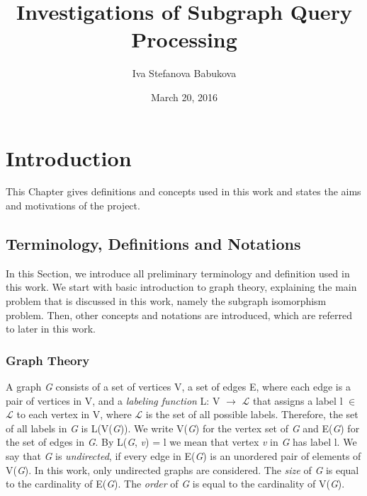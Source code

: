 \documentclass{l4proj}
\newcommand{\Lagr}{\mathcal{L}}
\begin{document}
\title{Investigations of Subgraph Query Processing}
\author{Iva Stefanova Babukova}
\date{March 20, 2016}
\maketitle

\begin{abstract}


\end{abstract}

\educationalconsent
%
%
\tableofcontents
\chapter{Introduction}
\label{ch:introduction}

This Chapter gives definitions and concepts used in this work and states the aims and motivations of the project. 

\section{Terminology, Definitions and Notations}
\label{sec:theory}
In this Section, we introduce all preliminary terminology and definition used in this work. We start with basic introduction to graph theory, explaining the main problem that is discussed in this work, namely the subgraph isomorphism problem. Then, other concepts and notations are introduced, which are referred to later in this work.

\subsection{Graph Theory}
\label{sec:graphTheory}

A graph \emph{G} consists of a set of vertices V, a set of edges E, where each edge is a pair of vertices in V, and a \emph{labeling function} L: V $\rightarrow$ $\Lagr$ that assigns a label l $\in$ $\Lagr$ to each vertex in V, where $\Lagr$ is the set of all possible labels. Therefore, the set of all labels in \emph{G} is L(V(\emph{G})). We write V(\emph{G}) for the vertex set of \emph{G} and E(\emph{G}) for the set of edges in \emph{G}. By L(\emph{G}, \emph{v}) = l we mean that vertex \emph{v} in \emph{G} has label l.
We say that \emph{G} is \emph{undirected}, if every edge in E(\emph{G}) is an unordered pair of elements of V(\emph{G}). In this work, only undirected graphs are considered. The \emph{size} of \emph{G} is equal to the cardinality of E(\emph{G}). The \emph{order} of \emph{G} is equal to the cardinality of V(\emph{G}).
\end{document}
